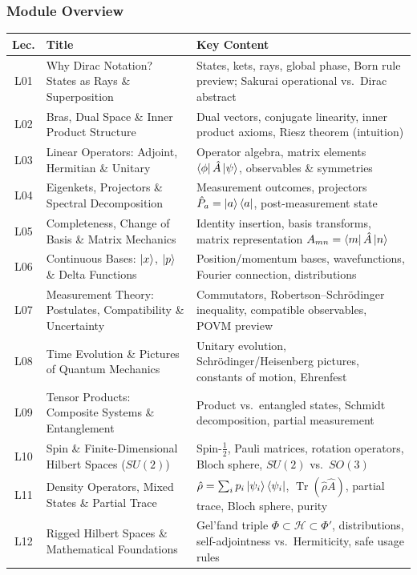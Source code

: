 \documentclass[11pt,a4paper]{article}
\begin{document}
\subsubsection*{Module Overview}

\begin{center}
\begin{tabularx}{\textwidth}{clX}
\toprule
\textbf{Lec.} & \textbf{Title} & \textbf{Key Content}\\
\midrule
L01 & Why Dirac Notation? States as Rays \& Superposition &
      States, kets, rays, global phase, Born rule preview; Sakurai operational vs.\ Dirac abstract\\
L02 & Bras, Dual Space \& Inner Product Structure &
      Dual vectors, conjugate linearity, inner product axioms, Riesz theorem (intuition)\\
L03 & Linear Operators: Adjoint, Hermitian \& Unitary &
      Operator algebra, matrix elements $\bra{\phi}\hat{A}\ket{\psi}$, observables \& symmetries\\
L04 & Eigenkets, Projectors \& Spectral Decomposition &
      Measurement outcomes, projectors $\hat{P}_a=\ket{a}\bra{a}$, post-measurement state\\
L05 & Completeness, Change of Basis \& Matrix Mechanics &
      Identity insertion, basis transforms, matrix representation $A_{mn}=\bra{m}\hat{A}\ket{n}$\\
L06 & Continuous Bases: $\ket{x}$, $\ket{p}$ \& Delta Functions &
      Position/momentum bases, wavefunctions, Fourier connection, distributions\\
L07 & Measurement Theory: Postulates, Compatibility \& Uncertainty &
      Commutators, Robertson--Schr\"odinger inequality, compatible observables, POVM preview\\
L08 & Time Evolution \& Pictures of Quantum Mechanics &
      Unitary evolution, Schr\"odinger/Heisenberg pictures, constants of motion, Ehrenfest\\
L09 & Tensor Products: Composite Systems \& Entanglement &
      Product vs.\ entangled states, Schmidt decomposition, partial measurement\\
L10 & Spin \& Finite-Dimensional Hilbert Spaces ($SU(2)$) &
      Spin-$\tfrac{1}{2}$, Pauli matrices, rotation operators, Bloch sphere, $SU(2)$ vs.\ $SO(3)$\\
L11 & Density Operators, Mixed States \& Partial Trace &
      $\hat{\rho}=\sum_i p_i\ket{\psi_i}\bra{\psi_i}$, $\operatorname{Tr}(\hat{\rho}\hat{A})$,
      partial trace, Bloch sphere, purity\\
L12 & Rigged Hilbert Spaces \& Mathematical Foundations &
      Gel'fand triple $\Phi\subset\mathcal{H}\subset\Phi'$, distributions, self-adjointness
      vs.\ Hermiticity, safe usage rules\\
\bottomrule
\end{tabularx}
\end{center}
\end{document}

